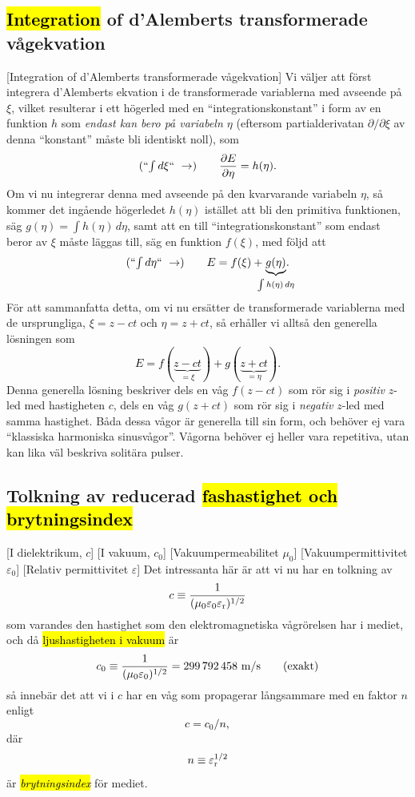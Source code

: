 {{{{{\subsection{{\hl{Integration}} of d'Alemberts transformerade v{\aa}gekvation}
[Integration of d'Alemberts
  transformerade v{\aa}gekvation]
Vi v{\"a}ljer att f{\"o}rst integrera d'Alemberts ekvation i de transformerade
variablerna med avseende p{\aa} $\xi$, vilket resulterar i ett h{\"o}gerled med
en ``integrationskonstant'' i form av en funktion $h$ som {\it endast kan bero
p{\aa} variabeln $\eta$} (eftersom partialderivatan $\partial/\partial\xi$ av
denna ``konstant'' m{\aa}ste bli identiskt noll), som
\hl{$$
  (\hbox{``$\int d\xi$`` }\to)\qquad
  {{\partial E}\over{\partial\eta}}=h(\eta).
$$}
Om vi nu integrerar denna med avseende p{\aa} den kvarvarande variabeln $\eta$,
s{\aa} kommer det ing{\aa}ende h{\"o}gerledet $h(\eta)$ ist{\"a}llet att bli
den primitiva funktionen, s{\"a}g $g(\eta)=\int h(\eta)\,d\eta$, samt
att en till ``integrationskonstant'' som endast beror av $\xi$ m{\aa}ste
l{\"a}ggas till, s{\"a}g en funktion $f(\xi)$, med f{\"o}ljd att
\hl{$$
  (\hbox{``$\int d\eta$`` }\to)\qquad
  E=f(\xi)+\kern-7pt\underbrace{g(\eta)}_{\int h(\eta)\,d\eta}\kern-9pt.
$$}
F{\"o}r att sammanfatta detta, om vi nu ers{\"a}tter de transformerade
variablerna med de ursprungliga, $\xi=z-ct$ och $\eta=z+ct$, s{\aa}
erh{\aa}ller vi allts{\aa} den generella l{\"o}sningen som
\hl{$$
  E = f(\underbrace{z-ct}_{=\xi}) + g(\underbrace{z+ct}_{=\eta}).
$$}
Denna generella l{\"o}sning beskriver dels en v{\aa}g $f(z-ct)$ som r{\"o}r sig
i {\it positiv} $z$-led med hastigheten $c$, dels en v{\aa}g $g(z+ct)$ som
r{\"o}r sig i {\it negativ} $z$-led med samma hastighet. B{\aa}da dessa
v{\aa}gor {\"a}r generella till sin form, och beh{\"o}ver ej vara ``klassiska
harmoniska sinusv{\aa}gor''. V{\aa}gorna beh{\"o}ver ej heller vara repetitiva,
utan kan lika v{\"a}l beskriva solit{\"a}ra pulser.
\medskip

\subsection{Tolkning av reducerad {\hl{fashastighet och brytningsindex}}}
[I dielektrikum, $c$]
[I vakuum, $c_0$]
[Vakuumpermeabilitet $\mu_0$]
[Vakuumpermittivitet $\varepsilon_0$]
[Relativ permittivitet $\varepsilon$]
Det intressanta h{\"a}r {\"a}r att vi nu har en tolkning av
\hl{$$
  c \equiv {{1}\over{(\mu_0\varepsilon_0\varepsilon_{\rm r})^{1/2}}}
$$}
som varandes den hastighet som den elektromagnetiska v{\aa}gr{\"o}relsen har i
mediet, och d{\aa} {\hl{ljus\-hastig\-heten i vakuum}} {\"a}r
\hl{$$
  c_0 \equiv {{1}\over{(\mu_0\varepsilon_0)^{1/2}}}
      = 299\,792\,458\ {\rm m}/{\rm s}\qquad(\hbox{exakt})
$$}
s{\aa} inneb{\"a}r det att vi i $c$ har en v{\aa}g som propagerar
l{\aa}ngsammare med en faktor $n$ enligt
\hl{$$
  c = c_0/n,
$$}
d{\"a}r
\hl{$$
  n \equiv\varepsilon^{1/2}_{\rm r}
$$}
{\"a}r {\hl{{\it brytningsindex}}} f{\"o}r mediet.

}}}}}
